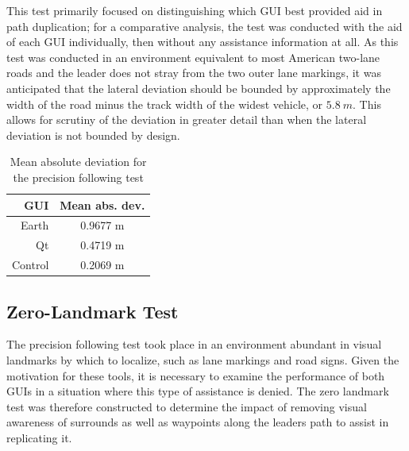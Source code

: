 \documentclass[twocolumn,10pt]{article}
\begin{document}
    This test primarily focused on distinguishing which GUI best provided aid in path duplication; for a comparative analysis, the test was conducted with the aid of each GUI individually, then without any assistance information at all.  As this test was conducted in an environment equivalent to most American two-lane roads and the leader does not stray from the two outer lane markings, it was anticipated that the lateral deviation should be bounded by approximately the width of the road minus the track width of the widest vehicle, or $5.8~m$.  This allows for scrutiny of the deviation in greater detail than when the lateral deviation is not bounded by design.

    \begin{table}[htbp] \centering \caption{Mean absolute deviation for the precision following test}
    \begin{tabular}{r|c} 
        GUI&    Mean abs. dev. \\ \hline\hline
        Earth&      0.9677 m \\
        Qt&   0.4719 m \\
        Control&    0.2069 m \\ \hline   
    \end{tabular} \label{tab:precision_dev_mean} \end{table}

  \subsection*{Zero-Landmark Test}

    The precision following test took place in an environment abundant in visual landmarks by which to localize, such as lane markings and road signs.  Given the motivation for these tools, it is necessary to examine the performance of both GUIs in a situation where this type of assistance is denied.  The zero landmark test was therefore constructed to determine the impact of removing visual awareness of surrounds as well as waypoints along the leaders path to assist in replicating it.
    
\end{document}
